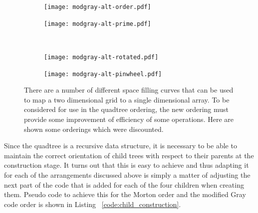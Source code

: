 \begin{figure}[tbhp]
    \centering
    \begin{subfigure}[b]{3.5cm}
        \texttt{[image: modgray-alt-order.pdf]}
        \caption{} \label{fig:modgray-alt-order.pdf}
    \end{subfigure}%
    \quad
    \begin{subfigure}[b]{3.5cm}
        \texttt{[image: modgray-alt-prime.pdf]}
        \caption{} \label{fig:modgray-alt-prime.pdf}
    \end{subfigure}
    \\[0.2cm]
    \begin{subfigure}[b]{3.5cm}
        \texttt{[image: modgray-alt-rotated.pdf]}
        \caption{} \label{fig:modgray-alt-rotated.pdf}
    \end{subfigure}%
    \quad
    \begin{subfigure}[b]{3.5cm}
        \texttt{[image: modgray-alt-pinwheel.pdf]}
        \caption{}\label{fig:modgray-alt-pinwheel.pdf}
    \end{subfigure}
	\caption{There are a number of different space filling curves that can be
	used to map a two dimensional grid to a single dimensional array. To be
	considered for use in the quadtree ordering, the new ordering must provide
	some improvement of efficiency of some operations. Here are shown some
	orderings which were discounted.}
	\label{fig:modgray-2-alternatives}
\end{figure}

Since the quadtree is a recursive data structure, it is necessary to be able
to maintain the correct orientation of child trees with respect to their
parents at the construction stage. It turns out that this is easy to achieve
and thus adapting it for each of the arrangements discussed above is simply a
matter of adjusting the next part of the code that is added for each of the
four children when creating them. Pseudo code to achieve this for the Morton
order and the modified Gray code order is shown in Listing
~\ref{code:child_construction}.

